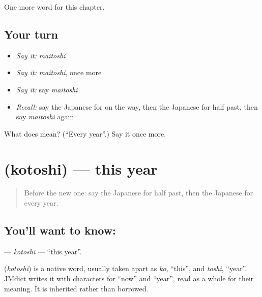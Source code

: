 \begin{grammarlens}[title={What you've built}]
One more word for this chapter.
\end{grammarlens}

\subsection*{Your turn}
\begin{itemize}
\raggedright
  \item \emph{Say it:} \emph{maitoshi}
  \item \emph{Say it:} \emph{maitoshi}, once more
  \item \emph{Say it:} say \emph{maitoshi}
  \item \emph{Recall:} say the Japanese for on the way, then the Japanese for half past, then say \emph{maitoshi} again
\end{itemize}

\begin{tcolorbox}[breakable,colback=teal!4,colframe=teal!35!black,title={Before you move on}]
What does  mean? (\textquotedblleft{}Every year\textquotedblright{}.) Say it once more.
\end{tcolorbox}
\section[\texorpdfstring{\ja{ことし} (kotoshi)}{ことし (kotoshi)}]{ (kotoshi) — this year}

\label{lesson:JA-C75-kotoshi}



\begin{quote}
Before the new one: say the Japanese for half past, then the Japanese for every year.
\end{quote}

\subsection*{You'll want to know: }
\textbf{} — \emph{kotoshi} — \textquotedblleft{}this year\textquotedblright{}.

\begin{cousinweb}
\textbf{} (\emph{kotoshi}) is a native word, usually taken apart as \emph{ko}, \textquotedblleft{}this\textquotedblright{}, and \emph{toshi}, \textquotedblleft{}year\textquotedblright{}. JMdict writes it with characters for \textquotedblleft{}now\textquotedblright{} and \textquotedblleft{}year\textquotedblright{}, read as a whole for their meaning. It is inherited rather than borrowed.
\end{cousinweb}

